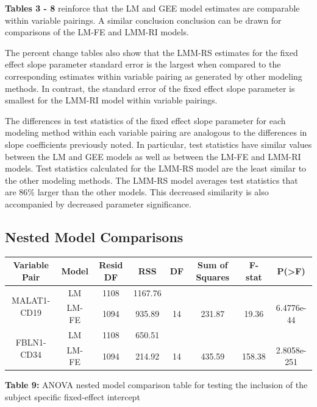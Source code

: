 \documentclass[12pt,]{article}
\begin{document}
\textbf{Tables 3 - 8} reinforce that the LM and GEE model estimates are
comparable within variable pairings. A similar conclusion conclusion can
be drawn for comparisons of the LM-FE and LMM-RI models.

The percent change tables also show that the LMM-RS estimates for the
fixed effect slope parameter standard error is the largest when compared
to the corresponding estimates within variable pairing as generated by
other modeling methods. In contrast, the standard error of the fixed
effect slope parameter is smallest for the LMM-RI model within variable
pairings.

The differences in test statistics of the fixed effect slope parameter
for each modeling method within each variable pairing are analogous to
the differences in slope coefficients previously noted. In particular,
test statistics have similar values between the LM and GEE models as
well as between the LM-FE and LMM-RI models. Test statistics calculated
for the LMM-RS model are the least similar to the other modeling
methods. The LMM-RS model averages test statistics that are 86\% larger
than the other models. This decreased similarity is also accompanied by
decreased parameter significance.

\hypertarget{nested-model-comparisons}{%
\subsection{Nested Model Comparisons}\label{nested-model-comparisons}}

\begin{center}
\begin{tabular}{|c|c|c|c|c|c|c|c|}
\hline
Variable Pair & Model & Resid DF & RSS & DF & Sum of Squares & F-stat & P(>F) \\
\hline
\hline
\multirow{2}{*}{MALAT1-CD19} & LM & 1108 & 1167.76 & & & & \\
 & LM-FE & 1094 & 935.89 & 14 & 231.87 & 19.36 &  6.4776e-44 \\
\hline
\hline
\multirow{2}{*}{FBLN1-CD34} & LM & 1108 & 650.51 & & & & \\
 & LM-FE & 1094 & 214.92 & 14 & 435.59 & 158.38 &  2.8058e-251 \\
\hline
\hline
\end{tabular}

\vspace{5pt}

\textbf{Table 9:} ANOVA nested model comparison table for testing the inclusion of the subject specific fixed-effect intercept
\end{center}
\end{document}
